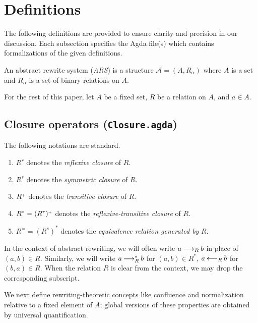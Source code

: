 \section{Definitions}
\label{sec:Definitions}
The following definitions are provided to ensure clarity and precision
in our discussion. Each subsection specifies the Agda file(s) which contains formalizations of the given definitions.

\begin{definition}
    An abstract rewrite system (\emph{ARS}) is a structure $\mathcal{A} = (A, R_\alpha)$ where
     $A$ is a set and $R_\alpha$ is a set of binary relations on $A$.
\end{definition}

For the rest of this paper, let $A$ be a fixed set, $R$ be a relation on $A$, and $a \in A$.



\subsection{Closure operators (\texttt{Closure.agda})}

\begin{notation} 
The following notations are standard.
  \begin{enumerate}
    \item $R^r$ denotes the \emph{reflexive closure} of $R$.
    \item $R^s$ denotes the \emph{symmetric closure} of $R$.
    \item ${R}^{\scriptscriptstyle{+}}$ denotes the \emph{transitive closure} of $R$.
    \item $R^* = (R^r){}^{\scriptscriptstyle{+}}$ denotes the \emph{reflexive-transitive closure} of $R$.
    \item $R^= = (R^s)^*$ denotes the \emph{equivalence relation generated by} $R$.
  \end{enumerate}
\end{notation}




In the context of abstract rewriting, we will often write $a \mathbin{\longrightarrow_R} b$
in place of $(a,b) \in R$.  Similarly, we will write $a \mathbin{\longrightarrow_R^*} b$ for $(a,b) \in R^*$,
$a \mathbin{\longleftarrow_R} b$ for $(b,a) \in R$.  When the relation $R$ is clear from the context,
we may drop the corresponding subscript.

We next define rewriting-theoretic concepts like confluence and normalization relative to a fixed element of $A$; global versions of these properties are obtained by universal quantification.
